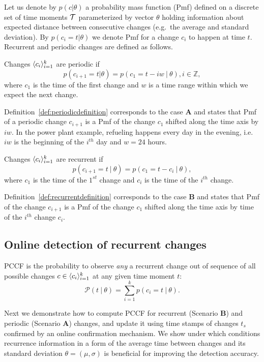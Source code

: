 Let us denote by $p(c|\theta)$ a probability mass function (Pmf) defined on a discrete set of time moments $\mathcal{T}$ parameterized by vector $\theta$ holding information about expected distance between consecutive changes (e.g.\ the average and standard deviation).
By $p(c_i=t|\theta)$ we denote Pmf for a change $c_i$ to happen at time $t$. Recurrent and periodic changes are defined as follows.
\begin{definition}
\label{def:periodicdefinition}
Changes $\langle c_i \rangle_{i=1}^k$ are periodic if
\begin{equation}
p(c_{i+1} = t|\theta) = p(c_1 = t - i w \: | \: \theta), i \in \mathbb{Z},
\label{eq:procwithrefs}
\end{equation}
where $c_1$ is the time of the first change and $w$ is a time range within which we expect the next change.
\end{definition}
Definition~\ref{def:periodicdefinition} corresponds to the case \textbf{A} and states that Pmf of a periodic change $c_{i+1}$ is a Pmf of the change $c_1$ shifted along the time axis by  $i w$.
In the power plant example, refueling happens every day in the evening, i.e.\ $i w$ is the beginning of the $i^{th}$ day and $w = 24$ hours.
\begin{definition}
\label{def:recurrentdefinition}
Changes $\langle  c_i  \rangle_{i=1}^k$ are recurrent if
\begin{equation}
p(c_{i+1} = t \: | \: \theta) = p(c_1 = t - c_{i} \: | \: \theta),
\label{eq:procnorefs}
\end{equation}
where
$c_1$ is the time of the $1^{st}$ change and
$c_i$ is the time of the $i^{th}$ change.
\end{definition}
Definition~\ref{def:recurrentdefinition} corresponds to the case \textbf{B} and states that Pmf of the change $c_{i+1}$ is a Pmf of the change $c_1$ shifted along the time axis by time of the $i^{th}$ change $c_i$.

\subsection{Online detection of recurrent changes}
\label{subsec:predictionprocess}

\begin{definition}
\label{def:confidencefunc}
PCCF is the probability to observe \textit{any} a recurrent change out of sequence of all possible changes $c \in \langle  c_i  \rangle_{i=1}^k$ at any given time moment $t$:
\begin{equation}
\mathcal{P}(t \: | \: \theta) = \sum_{i=1}^{k} p(c_i = t \: | \: \theta).
\end{equation}
\end{definition}
Next we demonstrate how to compute PCCF for recurrent (Scenario \textbf{B}) and periodic (Scenario \textbf{A}) changes, and update it using time stamps of changes $t_s$ confirmed by an online confirmation mechanism.
We show under which conditions recurrence information in a form of the average time between changes and its standard deviation $\theta = (\mu, \sigma)$ is beneficial for improving the detection accuracy.

